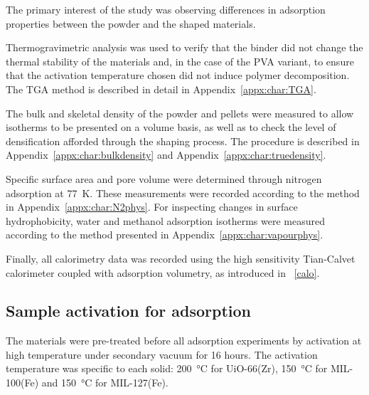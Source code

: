 The primary interest of the study was observing differences
in adsorption properties between the powder and the shaped materials.

Thermogravimetric analysis was used to verify that the binder
did not change the thermal stability of the materials and, in the
case of the PVA variant, to ensure that the activation temperature
chosen did not induce polymer decomposition. The TGA method is described
in detail in Appendix~\ref{appx:char:TGA}.

The bulk and skeletal density of the powder and pellets were measured
to allow isotherms to be presented on a volume basis, as well as
to check the level of densification afforded through the
shaping process. The procedure is described in Appendix~\ref{appx:char:bulkdensity} and Appendix~\ref{appx:char:truedensity}.

Specific surface area and pore volume were determined through
nitrogen adsorption at \SI{77}{\kelvin}. These measurements were
recorded according to the method in Appendix~\ref{appx:char:N2phys}.
For inspecting changes in surface hydrophobicity, water and
methanol adsorption isotherms were measured according to
the method presented in Appendix~\ref{appx:char:vapourphys}.

Finally, all calorimetry data was recorded using the high sensitivity
Tian-Calvet calorimeter coupled with adsorption volumetry, as
introduced in ~\autoref{calo}.

\subsection{Sample activation for adsorption}

The materials were pre-treated before all adsorption experiments by
activation at high temperature under secondary vacuum for 16 hours.
The activation temperature was specific
to each solid: \SI{200}{\degreeCelsius} for UiO-66(Zr),
\SI{150}{\degreeCelsius} for MIL-100(Fe) and \SI{150}{\degreeCelsius}
for MIL-127(Fe).
